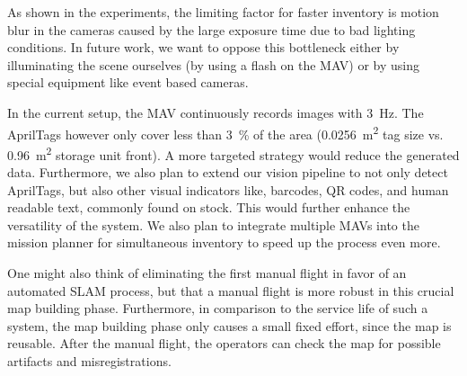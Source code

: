 As shown in the experiments, the limiting factor for faster inventory is motion blur in the cameras caused by the large exposure time due to bad lighting conditions. In future work, we want to oppose this bottleneck either by illuminating the scene ourselves (by using a flash on the MAV) or by using special equipment like \eg event based cameras.

In the current setup, the MAV continuously records images with \SI{3}{\hertz}. The AprilTags however only cover less than \SI{3}{\percent} of the area (\SI{0.0256}{\meter\squared} tag size vs. \SI{0.96}{\meter\squared} storage unit front). A more targeted strategy would reduce the generated data.
Furthermore, we also plan to extend our vision pipeline to not only detect AprilTags, but also other visual indicators like, \eg barcodes, QR codes, and human readable text, commonly found on stock. This would further enhance the versatility of the system.
We also plan to integrate multiple MAVs into the mission planner for simultaneous inventory to speed up the process even more.

One might also think of eliminating the first manual flight in favor of an automated SLAM process, but that a manual flight is more robust in this crucial map building phase. Furthermore, in comparison to the service life of such a system, the map building phase only causes a small fixed effort, since the map is reusable. After the manual flight, the operators can check the map for possible artifacts and misregistrations.
